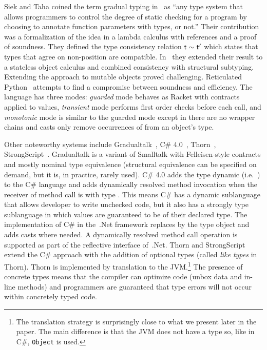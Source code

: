 \documentclass[acmlarge, anonymous, authordraft]{acmart}
\newcommand{\code}[1]{{\tt #1}\xspace}
\begin{document}
Siek and Taha coined the term gradual typing in~\cite{SiekTaha06} as ``any
type system that allows programmers to control the degree of static checking
for a program by choosing to annotate function parameters with types, or
not.'' Their contribution was a formalization of the idea in a lambda
calculus with references and a proof of soundness. They defined the type
consistency relation $\t \sim \tp$ which states that types that agree on
non-\any position are compatible.  In~\cite{SiekTaha07} they extended their
result to a stateless object calculus and combined consistency with
structural subtyping. Extending the approach to mutable objects proved
challenging. Reticulated Python~\cite{siek14} attempts to find a compromise
between soundness and efficiency.  The language has three modes:
\emph{guarded} mode behaves as Racket with contracts applied to values,
\emph{transient} mode performs first order checks before each call, and
\emph{monotonic} mode is similar to the guarded mode except in there are no
wrapper chains and casts only remove occurrences of \any from an object's
type.

Other noteworthy systems include Gradualtalk~\cite{GS13}, C\#
4.0~\cite{Bierman10}, Thorn~\cite{oopsla09},
StrongScript~\cite{ecoop15}. Gradualtalk is a variant of Smalltalk with
Felleisen-style contracts and mostly nominal type equivalence (structural
equivalence can be specified on demand, but it is, in practice, rarely
used). C\# 4.0 adds the type {\sf dynamic} (i.e.~\any) to the C\# language
and adds dynamically resolved method invocation when the receiver of method
call is with type \any.  This means C\# has a dynamic sublanguage that allows
developer to write unchecked code, but it also has a strongly type
sublanguage in which values are guaranteed to be of their declared type.
The implementation of C\# in the~.Net framework replaces \any by the type
{\sf object} and adds casts where needed. A dynamically resolved method call
operation is supported as part of the reflective interface of~.Net.  Thorn
and StrongScript extend the C\# approach with the addition of optional types
(called {\em like types} in Thorn).  Thorn is implemented by translation to
the JVM.\footnote{The translation strategy is surprisingly close to what we
  present later in the paper. The main difference is that the JVM does not
  have a type \any so, like in C\#, \code{Object} is used.} The presence of
concrete types means that the compiler can optimize code (unbox data and
in-line methods) and programmers are guaranteed that type errors will not
occur within concretely typed code. 
\end{document}
